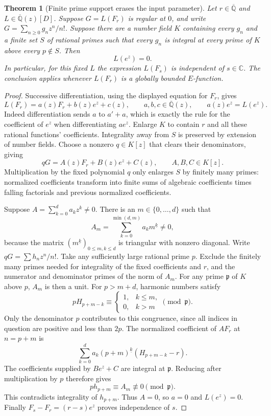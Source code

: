 \documentclass[11pt,a4paper]{article}
\newtheorem{theorem}{Theorem}[section]
\theoremstyle{definition}
\theoremstyle{remark}
\theoremstyle{plain}
\numberwithin{equation}{section}
\begin{document}
\begin{theorem}[Finite prime support erases the input parameter]
\label{em:imp:erasure}
Let $r\in\overline{\mathbb Q}$ and
$L\in\overline{\mathbb Q}(z)[D]$. Suppose $G=L(F_r)$ is regular
at $0$, and write $G=\sum_{n\ge0}g_nz^n/n!$.
Suppose there are a number field $K$ containing every $g_n$ and a
finite set $S$ of rational primes such that every $g_n$ is integral
at every prime of $K$ above every $p\notin S$. Then
\[
 L(e^z)=0.
\]
In particular, for this fixed $L$ the expression $L(F_s)$ is independent
of $s\in\mathbb C$. The conclusion applies whenever $L(F_r)$ is a
globally bounded $E$-function.
\end{theorem}

\begin{proof}
Successive differentiation, using the displayed equation for $F_r$,
gives
\[
 L(F_r)=a(z)F_r+b(z)e^z+c(z),\qquad
 a,b,c\in\overline{\mathbb Q}(z),\qquad
 a(z)e^z=L(e^z).
\]
Indeed differentiation sends $a$ to $a'+a$, which is exactly the rule
for the coefficient of $e^z$ when differentiating $ae^z$.
Enlarge $K$ to contain $r$ and all these rational functions' coefficients.
Integrality away from $S$ is preserved by extension of number fields.
Choose a nonzero $q\in K[z]$ that clears their denominators, giving
\[
 qG=A(z)F_r+B(z)e^z+C(z),\qquad A,B,C\in K[z].
\]
Multiplication by the fixed polynomial $q$ only enlarges $S$ by
finitely many primes: normalized coefficients transform into finite
sums of algebraic coefficients times falling factorials and previous
normalized coefficients.

Suppose $A=\sum_{k=0}^d a_kz^k\ne0$. There is an $m\in\{0,\ldots,d\}$
such that
\[
 A_m=\sum_{k=0}^{\min(d,m)}a_km^{\underline{k}}\ne0,
\]
because the matrix $(m^{\underline{k}})_{0\le m,k\le d}$ is triangular
with nonzero diagonal. Write $qG=\sum h_nz^n/n!$.
Take any sufficiently large rational prime $p$. Exclude the finitely
many primes needed for integrality of the fixed coefficients and $r$,
and the numerator and denominator primes of the norm of $A_m$.
For any prime $\mathfrak p$ of $K$ above $p$, $A_m$ is then a unit.
For $p>m+d$, harmonic numbers satisfy
\[
 pH_{p+m-k}\equiv
 \begin{cases}1,& k\le m,\\0,&k>m\end{cases}
 \pmod{\mathfrak p}.
\]
Only the denominator $p$ contributes to this congruence, since all
indices in question are positive and less than $2p$.
The normalized coefficient of $A F_r$ at $n=p+m$ is
\[
 \sum_{k=0}^d a_k(p+m)^{\underline{k}}(H_{p+m-k}-r).
\]
The coefficients supplied by $B e^z+C$ are integral at
$\mathfrak p$. Reducing after multiplication by $p$ therefore gives
\[
 p h_{p+m}\equiv A_m\not\equiv0\pmod{\mathfrak p}.
\]
This contradicts integrality of $h_{p+m}$. Thus $A=0$, so $a=0$ and
$L(e^z)=0$. Finally $F_s-F_r=(r-s)e^z$ proves independence of $s$.
\end{proof}
\end{document}
